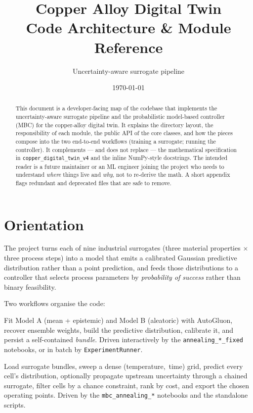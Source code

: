 \documentclass[11pt,a4paper]{article}
\title{\textbf{Copper Alloy Digital Twin}\\[0.3em]
\large Code Architecture \& Module Reference}
\author{Uncertainty-aware surrogate pipeline}
\date{\today}
\newcommand{\code}[1]{\texttt{\small #1}}
\newcommand{\file}[1]{\texttt{\small #1}}
\begin{document}
\maketitle

\begin{abstract}
\noindent
This document is a developer-facing map of the codebase that implements the
uncertainty-aware surrogate pipeline and the probabilistic model-based
controller (MBC) for the copper-alloy digital twin. It explains the directory
layout, the responsibility of each module, the public API of the core classes,
and how the pieces compose into the two end-to-end workflows (training a
surrogate; running the controller). It complements --- and does not replace ---
the mathematical specification in \file{copper\_digital\_twin\_v4} and the
inline NumPy-style docstrings. The intended reader is a future maintainer or an
ML engineer joining the project who needs to understand \emph{where} things
live and \emph{why}, not to re-derive the math. A short appendix flags
redundant and deprecated files that are safe to remove.
\end{abstract}

\tableofcontents
\vspace{1em}

\section{Orientation}

The project turns each of nine industrial surrogates (three material properties
$\times$ three process steps) into a model that emits a calibrated Gaussian
predictive distribution rather than a point prediction, and feeds those
distributions to a controller that selects process parameters by
\emph{probability of success} rather than binary feasibility.

Two workflows organise the code:

\begin{description}[leftmargin=1.4em,style=nextline]
  \item[Workflow A --- Train a surrogate.]
    Fit Model A (mean + epistemic) and Model B (aleatoric) with AutoGluon,
    recover ensemble weights, build the predictive distribution, calibrate it,
    and persist a self-contained \emph{bundle}. Driven interactively by the
    \file{annealing\_*\_fixed} notebooks, or in batch by \code{ExperimentRunner}.
  \item[Workflow B --- Run the controller.]
    Load surrogate bundles, sweep a dense \mbox{(temperature, time)} grid,
    predict every cell's distribution, optionally propagate upstream
    uncertainty through a chained surrogate, filter cells by a chance
    constraint, rank by cost, and export the chosen operating points. Driven by
    the \file{mbc\_annealing\_*} notebooks and the standalone scripts.
\end{description}
\end{document}
